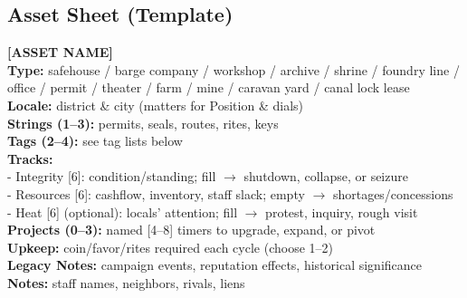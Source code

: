 \documentclass[10pt]{article}
\begin{document}
    \subsection{Asset Sheet (Template)}
    \begin{framed}
    \noindent\textbf{[ASSET NAME]}\\
    \textbf{Type:} safehouse / barge company / workshop / archive / shrine / foundry line / office / permit / theater / farm / mine / caravan yard / canal lock lease\\
    \textbf{Locale:} district \& city (matters for Position \& dials)\\
    \textbf{Strings (1--3):} permits, seals, routes, rites, keys\\
    \textbf{Tags (2--4):} see tag lists below\\
    \textbf{Tracks:}\\
    \hspace{10pt}- Integrity [6]: condition/standing; fill $\rightarrow$ shutdown, collapse, or seizure\\
    \hspace{10pt}- Resources [6]: cashflow, inventory, staff slack; empty $\rightarrow$ shortages/concessions\\
    \hspace{10pt}- Heat [6] (optional): locals' attention; fill $\rightarrow$ protest, inquiry, rough visit\\
    \textbf{Projects (0--3):} named [4--8] timers to upgrade, expand, or pivot\\
    \textbf{Upkeep:} coin/favor/rites required each cycle (choose 1--2)\\
    \textbf{Legacy Notes:} campaign events, reputation effects, historical significance\\
    \textbf{Notes:} staff names, neighbors, rivals, liens
    \end{framed}
    
\end{document}

